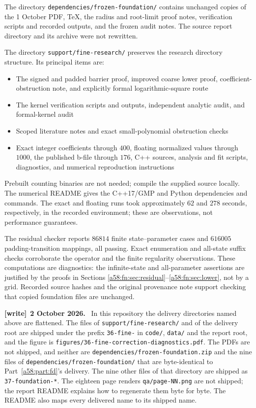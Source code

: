 \documentclass[11pt,letterpaper]{article}
\newcommand{\file}[1]{\nolinkurl{#1}}
\theoremstyle{remark}
\newenvironment{writenote}[1][]{\par\smallskip\begingroup\small
 \noindent\textbf{[write]}\if\relax\detokenize{#1}\relax\else~\textbf{#1.}\fi\ }%
 {\par\endgroup\smallskip}
\begin{document}
The directory \texttt{dependencies/frozen-foundation/} contains unchanged copies of the 1 October PDF, TeX, the radius and root-limit proof notes, verification scripts and recorded outputs, and the frozen audit notes. The source report directory and its archive were not rewritten.

The directory \texttt{support/fine-research/} preserves the research directory structure. Its principal items are:
\begin{itemize}
\item The signed and padded barrier proof, improved coarse lower proof, coefficient-obstruction note, and explicitly formal logarithmic-square route
\item The kernel verification scripts and outputs, independent analytic audit, and formal-kernel audit
\item Scoped literature notes and exact small-polynomial obstruction checks
\item Exact integer coefficients through $400$, floating normalized values through $1000$, the published b-file through $176$, C++ sources, analysis and fit scripts, diagnostics, and numerical reproduction instructions
\end{itemize}
Prebuilt counting binaries are not needed; compile the supplied source locally. The numerical README gives the C++17/GMP and Python dependencies and commands. The exact and floating runs took approximately $62$ and $278$ seconds, respectively, in the recorded environment; these are observations, not performance guarantees.

The residual checker reports $86814$ finite state--parameter cases and $616005$ padding-transition mappings, all passing. Exact enumeration and all-state suffix checks corroborate the operator and the finite regularity observations. These computations are diagnostics: the infinite-state and all-parameter assertions are justified by the proofs in Sections \ref{a58:fn:sec:residual}--\ref{a58:fn:sec:lower}, not by a grid. Recorded source hashes and the original provenance note support checking that copied foundation files are unchanged.
\begin{writenote}[2 October 2026]
In this repository the delivery directories named above are flattened. The files of \file{support/fine-research/} and of the delivery root are shipped under the prefix \file{36-fine-} in \file{code/}, \file{data/} and the report root, and the figure is \file{figures/36-fine-correction-diagnostics.pdf}. The PDFs are not shipped, and neither are \file{dependencies/frozen-foundation.zip} and the nine files of \file{dependencies/frozen-foundation/} that are byte-identical to Part~\ref{a58:part:fd}'s delivery. The nine other files of that directory are shipped as \file{37-foundation-*}. The eighteen page renders \file{qa/page-NN.png} are not shipped; the report README explains how to regenerate them byte for byte. The README also maps every delivered name to its shipped name.
\end{writenote}
\end{document}

